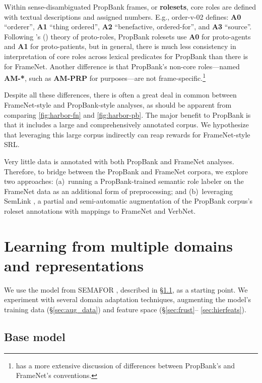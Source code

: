 \documentclass[11pt,a4paper]{article}
\newcommand{\citeposs}[2][]{\citeauthor{#2}'s (\citeyear[#1]{#2})}
\newcommand{\pbf}[1]{\mbox{\textsf{#1}}} %
\newcommand{\pbr}[1]{\textbf{\textsf{#1}}} %
\begin{document}
Within sense-disambiguated PropBank frames, or \textbf{rolesets}, 
core roles are defined with textual descriptions and assigned numbers. 
E.g., \pbf{order-v-02} defines: \pbr{A0} ``orderer'', 
\pbr{A1} ``thing ordered'', \pbr{A2} ``benefactive, ordered-for'', 
and \pbr{A3} ``source''.
Following \citeposs{dowty-91} theory of proto-roles, PropBank rolesets use \pbr{A0} for proto-agents 
and \pbr{A1} for proto-patients, but in general, there is much less consistency 
in interpretation of core roles across lexical predicates for PropBank than there is for FrameNet.
Another difference is that PropBank's non-core roles---named \pbr{AM-*}, 
such as \pbr{AM-PRP} for purposes---are not frame-specific.\footnote{ 
has a more extensive discussion of differences between PropBank's and FrameNet's conventions.}

Despite all these differences, there is often a great deal in common between 
FrameNet-style and PropBank-style analyses, as should be apparent from comparing 
\cref{fig:harbor-fn} and \cref{fig:harbor-pb}. 
The major benefit to PropBank is that it includes a large and comprehensively annotated corpus.
We hypothesize that leveraging this large corpus indirectly 
can reap rewards for FrameNet-style SRL. 

Very little data is annotated with both PropBank and FrameNet analyses.
Therefore, to bridge between the PropBank and FrameNet corpora, 
we explore two approaches: (a)~running a PropBank-trained semantic role labeler 
on the FrameNet data as an additional form of preprocessing; and 
(b)~leveraging SemLink \citep{bonial-13}, a partial and semi-automatic augmentation 
of the PropBank corpus's roleset annotations with mappings to FrameNet and VerbNet.

\section{Learning from multiple domains and representations}

We use the model from SEMAFOR \citep{das-14}, described in \S\ref{sec:base_model}, as a starting point.
We experiment with several domain adaptation techniques, augmenting the model's training data (\S\ref{sec:aug_data}) and feature space %
(\S\ref{sec:frust}--%
\ref{sec:hierfeats}).


\subsection{Base model}
\label{sec:base_model}
\end{document}

